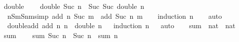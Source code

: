 \begin{isabellebody}
{\isachardoublequoteopen}double\ {}\ {\isacharequal}{\kern0pt}\ {}{\isachardoublequoteclose}\ {\isacharbar}{\kern0pt}\isanewline
{\isachardoublequoteopen}double\ {\isacharparenleft}{\kern0pt}Suc\ n{\isacharparenright}{\kern0pt}\ {\isacharequal}{\kern0pt}\ Suc\ {\isacharparenleft}{\kern0pt}Suc\ {\isacharparenleft}{\kern0pt}double\ n{\isacharparenright}{\kern0pt}{\isacharparenright}{\kern0pt}{\isachardoublequoteclose}\isanewline
\isanewline
{}\isamarkupfalse%
\ nSm{\isacharunderscore}{\kern0pt}Snm{\isacharbrackleft}{\kern0pt}simp{\isacharbrackright}{\kern0pt}{\isacharcolon}{\kern0pt}\ {\isachardoublequoteopen}add\ n\ {\isacharparenleft}{\kern0pt}Suc\ m{\isacharparenright}{\kern0pt}\ {\isacharequal}{\kern0pt}\ add\ {\isacharparenleft}{\kern0pt}Suc\ n{\isacharparenright}{\kern0pt}\ m{\isachardoublequoteclose}\isanewline
%
\isadelimproof
\ \ %
\endisadelimproof
%
\isatagproof
{}\isamarkupfalse%
\ {\isacharparenleft}{\kern0pt}induction\ n{\isacharparenright}{\kern0pt}\isanewline
\ \ \isamarkupfalse%
\ {\isacharparenleft}{\kern0pt}auto{\isacharparenright}{\kern0pt}\isanewline
{}\isamarkupfalse%
%
\endisatagproof
{\isafoldproof}%
%
\isadelimproof
\ \isanewline
%
\endisadelimproof
\isanewline
{}\isamarkupfalse%
\ double{\isacharunderscore}{\kern0pt}add{\isacharcolon}{\kern0pt}\ {\isachardoublequoteopen}add\ n\ n\ {\isacharequal}{\kern0pt}\ double\ n{\isachardoublequoteclose}\isanewline
%
\isadelimproof
\ \ %
\endisadelimproof
%
\isatagproof
{}\isamarkupfalse%
{\isacharparenleft}{\kern0pt}induction\ n{\isacharparenright}{\kern0pt}\isanewline
\ \ \isamarkupfalse%
{\isacharparenleft}{\kern0pt}auto{\isacharparenright}{\kern0pt}\isanewline
\ \ \isamarkupfalse%
%
\endisatagproof
{\isafoldproof}%
%
\isadelimproof
\isanewline
%
\endisadelimproof
\isanewline
{}\isamarkupfalse%
\ sum\ {\isacharcolon}{\kern0pt}{\isacharcolon}{\kern0pt}\ {\isachardoublequoteopen}nat\ {\isasymRightarrow}\ nat{\isachardoublequoteclose}\ \isanewline
{\isachardoublequoteopen}sum\ {}\ {\isacharequal}{\kern0pt}\ {}{\isachardoublequoteclose}\ {\isacharbar}{\kern0pt}\isanewline
{\isachardoublequoteopen}sum\ {\isacharparenleft}{\kern0pt}Suc\ n{\isacharparenright}{\kern0pt}\ {\isacharequal}{\kern0pt}\ {\isacharparenleft}{\kern0pt}Suc\ n{\isacharparenright}{\kern0pt}\ {\isacharplus}{\kern0pt}\ {\isacharparenleft}{\kern0pt}sum\ n{\isacharparenright}{\kern0pt}{\isachardoublequoteclose}\isanewline

\end{isabellebody}
